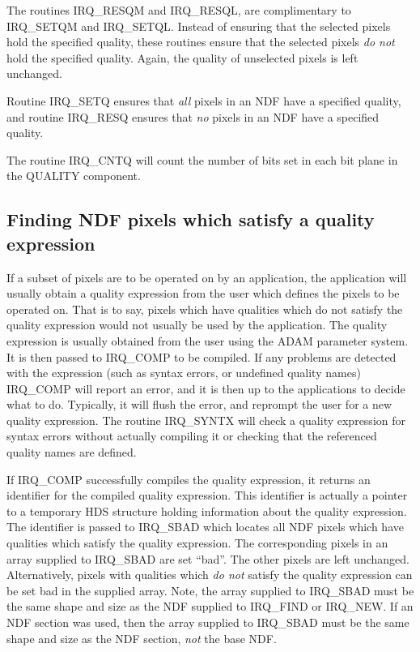 The routines IRQ\_RESQM and IRQ\_RESQL, are complimentary to IRQ\_SETQM and 
IRQ\_SETQL. Instead of ensuring that the selected pixels hold the specified
quality, these routines ensure that the selected pixels {\em do not} hold the 
specified quality. Again, the quality of unselected pixels is left unchanged.

Routine IRQ\_SETQ ensures that {\em all} pixels in an NDF have a specified
quality, and routine IRQ\_RESQ ensures that {\em no} pixels in an NDF have a
specified quality. 

The routine IRQ\_CNTQ will count the number of bits set in each bit plane in the
QUALITY component. 

\subsection{Finding NDF pixels which satisfy a quality expression}
\label {SEC:QEXP}
If a subset of pixels are to be operated on by an application, the application
will usually obtain a quality expression from the user which defines the pixels
to be operated on. That is to say, pixels which have qualities which do not
satisfy the quality expression would not usually be used by the application. The
quality expression is usually obtained from the user using the ADAM parameter
system. It is then passed to IRQ\_COMP to be compiled. If any problems are
detected with the expression (such as syntax errors, or undefined quality names)
IRQ\_COMP will report an error, and it is then up to the applications to decide 
what to do. Typically, it will flush the error, and reprompt the user for a new
quality expression. The routine IRQ\_SYNTX will check a quality expression for 
syntax errors without actually compiling it or checking that the referenced 
quality names are defined.

If IRQ\_COMP successfully compiles the quality expression, it returns an
identifier for the compiled quality expression. This identifier is actually a
pointer to a temporary HDS structure holding information about the quality
expression. The identifier is passed to IRQ\_SBAD which locates all NDF pixels
which have qualities which satisfy the quality expression. The corresponding
pixels in an array supplied to IRQ\_SBAD are set ``bad''. The other pixels are
left unchanged. Alternatively, pixels with qualities which {\em do not} satisfy
the quality expression can be set bad in the supplied array. Note, the array
supplied to IRQ\_SBAD must be the same shape and size as the NDF supplied to
IRQ\_FIND or IRQ\_NEW. If an NDF section was used, then the array supplied to
IRQ\_SBAD must be the same shape and size as the NDF section, {\em not} the base
NDF. 

